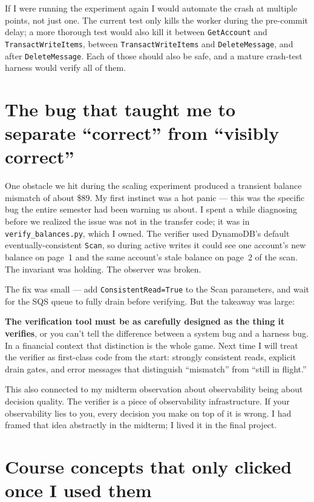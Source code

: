 \documentclass[11pt,a4paper]{article}
\begin{document}
If I were running the experiment again I would automate the crash at multiple points, not just one. The current test only kills the worker during the pre-commit delay; a more thorough test would also kill it between \texttt{GetAccount} and \texttt{TransactWriteItems}, between \texttt{TransactWriteItems} and \texttt{DeleteMessage}, and after \texttt{DeleteMessage}. Each of those should also be safe, and a mature crash-test harness would verify all of them.

\section{The bug that taught me to separate ``correct'' from ``visibly correct''}

One obstacle we hit during the scaling experiment produced a transient balance mismatch of about \$89. My first instinct was a hot panic --- this was the specific bug the entire semester had been warning us about. I spent a while diagnosing before we realized the issue was not in the transfer code; it was in \texttt{verify\_balances.py}, which I owned. The verifier used DynamoDB's default eventually-consistent \texttt{Scan}, so during active writes it could see one account's new balance on page~1 and the same account's stale balance on page~2 of the scan. The invariant was holding. The observer was broken.

The fix was small --- add \texttt{ConsistentRead=True} to the Scan parameters, and wait for the SQS queue to fully drain before verifying. But the takeaway was large:

\begin{insightbox}
\textbf{The verification tool must be as carefully designed as the thing it verifies}, or you can't tell the difference between a system bug and a harness bug. In a financial context that distinction is the whole game. Next time I will treat the verifier as first-class code from the start: strongly consistent reads, explicit drain gates, and error messages that distinguish ``mismatch'' from ``still in flight.''
\end{insightbox}

This also connected to my midterm observation about observability being about decision quality. The verifier is a piece of observability infrastructure. If your observability lies to you, every decision you make on top of it is wrong. I had framed that idea abstractly in the midterm; I lived it in the final project.

\section{Course concepts that only clicked once I used them}
\end{document}
